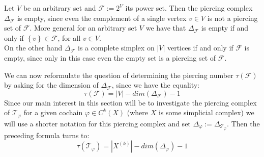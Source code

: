 \begin{expl}
Let \(V\) be an arbitrary set and \(\mathcal{F}:=2^V\) its power set. Then the piercing complex \(\Delta_{\mathcal{F}}\) is empty, since even the complement of a single vertex \(v\in V\) is not a piercing set of \(\mathcal{F}\). More general for an arbitrary set \(V\) we have that \(\Delta_{\mathcal{F}}\) is empty if and only if \(\left\{v\right\}\in\mathcal{F}\), for all \(v\in V\).\\
On the other hand \(\Delta_{\mathcal{F}}\) is a complete simplex on \(\left|V\right|\) vertices if and only if \(\mathcal{F}\) is empty, since only in this case even the empty set is a piercing set of \(\mathcal{F}\).
\end{expl}

We can now reformulate the question of determining the piercing number \(\tau(\mathcal{F})\) by asking for the dimension of \(\Delta_{\mathcal{F}}\), since we have the equality:
\[
\tau(\mathcal{F})=\left| V\right|-dim(\Delta_{\mathcal{F}})-1
\]
Since our main interest in this section will be to investigate the piercing complex of \(\mathcal{T}_{\varphi}\) for a given cochain \(\varphi\in C^k(X)\) (where \(X\) is some simplicial complex) we will use a shorter notation for this piercing complex and set \(\Delta_{\varphi}:=\Delta_{\mathcal{T}_{\varphi}}\). Then the preceding formula turns to:
\[
\tau(\mathcal{T}_{\varphi})=|X^{(k)}|-dim(\Delta_{\varphi})-1
\]

%



